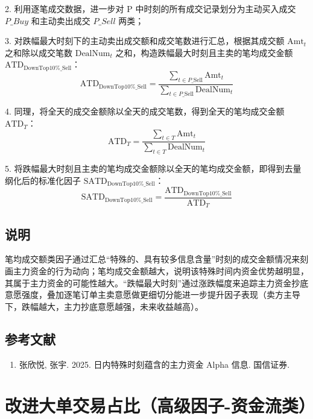 \documentclass{article}
\begin{document}
2. 利用逐笔成交数据，进一步对 P 中时刻的所有成交记录划分为主动买入成交 \( P\_Buy \) 和主动卖出成交 \( P\_Sell \) 两类；

3. 对跌幅最大时刻下的主动卖出成交额和成交笔数进行汇总，根据其成交额 \( \mathrm{Amt}_t \) 之和除以成交笔数 \( \mathrm{DealNum}_t \) 之和，构造跌幅最大时刻且主卖的笔均成交金额 \( \mathrm{ATD}_{\mathrm{DownTop10\%\_Sell}} \)：
\begin{equation}
    \mathrm{ATD}_{\mathrm{DownTop10\%\_Sell}} = \frac{\sum_{t \in P\_\mathrm{Sell}} \mathrm{Amt}_t}{\sum_{t \in P\_\mathrm{Sell}} \mathrm{DealNum}_t}
\end{equation}

4. 同理，将全天的成交金额除以全天的成交笔数，得到全天的笔均成交金额 \( \mathrm{ATD}_T \)：
\begin{equation}
    \mathrm{ATD}_T = \frac{\sum_{t \in T} \mathrm{Amt}_t}{\sum_{t \in T} \mathrm{DealNum}_t}
\end{equation}

5. 将跌幅最大时刻且主卖的笔均成交金额除以全天的笔均成交金额，即得到去量纲化后的标准化因子 \( \mathrm{SATD}_{\mathrm{DownTop10\%\_Sell}} \)：
\begin{equation}
    \mathrm{SATD}_{\mathrm{DownTop10\%\_Sell}} = \frac{\mathrm{ATD}_{\mathrm{DownTop10\%\_Sell}}}{\mathrm{ATD}_T}
\end{equation}

\subsection{说明}
笔均成交额类因子通过汇总“特殊的、具有较多信息含量”时刻的成交金额情况来刻画主力资金的行为动向；笔均成交金额越大，说明该特殊时间内资金优势越明显，其属于主力资金的可能性越大。“跌幅最大时刻”通过涨跌幅度来追踪主力资金抄底意愿强度，叠加逐笔订单主卖意愿做更细切分能进一步提升因子表现（卖方主导下，跌幅越大，主力抄底意愿越强，未来收益越高）。

\subsection{参考文献}
\begin{enumerate}
    \item 张欣悦, 张宇. 2025. 日内特殊时刻蕴含的主力资金 Alpha 信息. 国信证券.
\end{enumerate}

\section{改进大单交易占比（高级因子-资金流类）}
\end{document}

